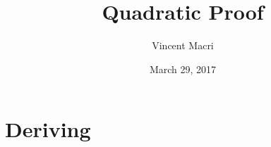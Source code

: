 \documentclass{article} %
\title{Quadratic Proof} %
\author{Vincent Macri} %
\date{March 29, 2017} %
\begin{document}
	\maketitle %
	\tableofcontents %
	\newpage %

	\section{Deriving} %
\end{document}
